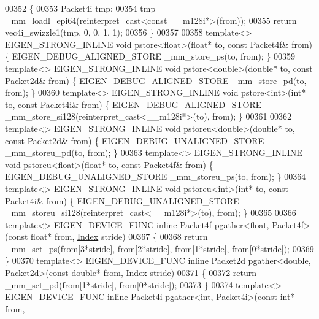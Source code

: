 \begin{DoxyCode}
00352 \{
00353   Packet4i tmp;
00354   tmp = \_mm\_loadl\_epi64(reinterpret\_cast<const \_\_m128i*>(from));
00355   \textcolor{keywordflow}{return} vec4i\_swizzle1(tmp, 0, 0, 1, 1);
00356 \}
00357 
00358 \textcolor{keyword}{template}<> EIGEN\_STRONG\_INLINE \textcolor{keywordtype}{void} pstore<float>(\textcolor{keywordtype}{float}*   to, \textcolor{keyword}{const} Packet4f& from) \{ 
      EIGEN\_DEBUG\_ALIGNED\_STORE \_mm\_store\_ps(to, from); \}
00359 \textcolor{keyword}{template}<> EIGEN\_STRONG\_INLINE \textcolor{keywordtype}{void} pstore<double>(\textcolor{keywordtype}{double}* to, \textcolor{keyword}{const} Packet2d& from) \{ 
      EIGEN\_DEBUG\_ALIGNED\_STORE \_mm\_store\_pd(to, from); \}
00360 \textcolor{keyword}{template}<> EIGEN\_STRONG\_INLINE \textcolor{keywordtype}{void} pstore<int>(\textcolor{keywordtype}{int}*       to, \textcolor{keyword}{const} Packet4i& from) \{ 
      EIGEN\_DEBUG\_ALIGNED\_STORE \_mm\_store\_si128(reinterpret\_cast<\_\_m128i*>(to), from); \}
00361 
00362 \textcolor{keyword}{template}<> EIGEN\_STRONG\_INLINE \textcolor{keywordtype}{void} pstoreu<double>(\textcolor{keywordtype}{double}* to, \textcolor{keyword}{const} Packet2d& from) \{ 
      EIGEN\_DEBUG\_UNALIGNED\_STORE \_mm\_storeu\_pd(to, from); \}
00363 \textcolor{keyword}{template}<> EIGEN\_STRONG\_INLINE \textcolor{keywordtype}{void} pstoreu<float>(\textcolor{keywordtype}{float}*   to, \textcolor{keyword}{const} Packet4f& from) \{ 
      EIGEN\_DEBUG\_UNALIGNED\_STORE \_mm\_storeu\_ps(to, from); \}
00364 \textcolor{keyword}{template}<> EIGEN\_STRONG\_INLINE \textcolor{keywordtype}{void} pstoreu<int>(\textcolor{keywordtype}{int}*       to, \textcolor{keyword}{const} Packet4i& from) \{ 
      EIGEN\_DEBUG\_UNALIGNED\_STORE \_mm\_storeu\_si128(reinterpret\_cast<\_\_m128i*>(to), from); \}
00365 
00366 \textcolor{keyword}{template}<> EIGEN\_DEVICE\_FUNC \textcolor{keyword}{inline} Packet4f pgather<float, Packet4f>(\textcolor{keyword}{const} \textcolor{keywordtype}{float}* from, 
      \hyperlink{namespace_eigen_a62e77e0933482dafde8fe197d9a2cfde}{Index} stride)
00367 \{
00368  \textcolor{keywordflow}{return} \_mm\_set\_ps(from[3*stride], from[2*stride], from[1*stride], from[0*stride]);
00369 \}
00370 \textcolor{keyword}{template}<> EIGEN\_DEVICE\_FUNC \textcolor{keyword}{inline} Packet2d pgather<double, Packet2d>(\textcolor{keyword}{const} \textcolor{keywordtype}{double}* from, 
      \hyperlink{namespace_eigen_a62e77e0933482dafde8fe197d9a2cfde}{Index} stride)
00371 \{
00372  \textcolor{keywordflow}{return} \_mm\_set\_pd(from[1*stride], from[0*stride]);
00373 \}
00374 \textcolor{keyword}{template}<> EIGEN\_DEVICE\_FUNC \textcolor{keyword}{inline} Packet4i pgather<int, Packet4i>(\textcolor{keyword}{const} \textcolor{keywordtype}{int}* from, 

\end{DoxyCode}

